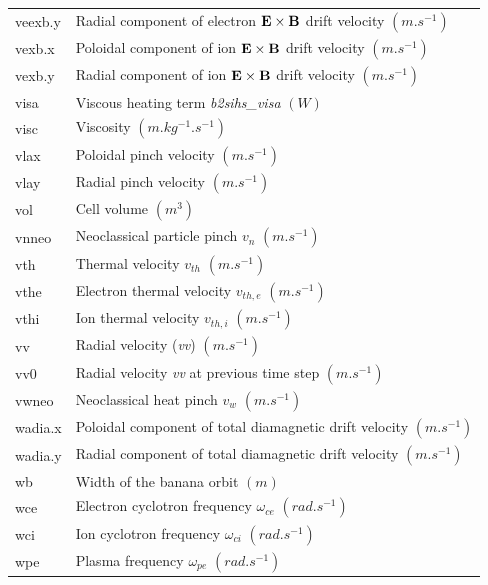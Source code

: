 \documentclass[a4paper,10pt]{report}
\begin{document}
\begin{center}
\begin{longtable}{|l|l|}
    veexb.y  & \index{b2plot, veexb.y} Radial component of electron ${\bf E} \times {\bf B}$ drift velocity $(m.s^{-1})$ \\
    vexb.x   & \index{b2plot, vexb.x} Poloidal component of ion ${\bf E} \times {\bf B}$ drift velocity $(m.s^{-1})$ \\
    vexb.y   & \index{b2plot, vexb.y} Radial component of ion ${\bf E} \times {\bf B}$ drift velocity $(m.s^{-1})$ \\
    visa     & \index{b2plot, visa} Viscous heating term {\em b2sihs\_visa} $(W)$ \\
    visc     & \index{b2plot, visc} Viscosity $(m.kg^{-1}.s^{-1})$ \\
    vlax     & \index{b2plot, vlax} Poloidal pinch velocity $(m.s^{-1})$ \\
    vlay     & \index{b2plot, vlay} Radial pinch velocity $(m.s^{-1})$ \\
    vol      & \index{b2plot, vol} Cell volume $(m^3)$ \\
    vnneo    & \index{b2plot, vnneo} Neoclassical particle pinch $v_n$ $(m.s^{-1})$ \\
    vth      & \index{b2plot, vth} Thermal velocity $v_{th}$ $(m.s^{-1})$ \\
    vthe     & \index{b2plot, vthe} Electron thermal velocity $v_{th,e}$ $(m.s^{-1})$ \\
    vthi     & \index{b2plot, vthi} Ion thermal velocity $v_{th,i}$ $(m.s^{-1})$ \\
    vv       & \index{b2plot, vv} Radial velocity ({\em vv}) $(m.s^{-1})$ \\
    vv0      & \index{b2plot, vv0} Radial velocity {\em vv} at previous time step $(m.s^{-1})$ \\
    vwneo    & \index{b2plot, vnneo} Neoclassical heat pinch $v_w$ $(m.s^{-1})$ \\
    wadia.x  & \index{b2plot, wadia.x} Poloidal component of total diamagnetic drift velocity $(m.s^{-1})$ \\
    wadia.y  & \index{b2plot, wadia.y} Radial component of total diamagnetic drift velocity $(m.s^{-1})$ \\
    wb       & \index{b2plot, wb} Width of the banana orbit $(m)$ \\
    wce      & \index{b2plot, wce} Electron cyclotron frequency $\omega_{ce}$ $(rad.s^{-1})$ \\
    wci      & \index{b2plot, wci} Ion cyclotron frequency $\omega_{ci}$ $(rad.s^{-1})$ \\
    wpe      & \index{b2plot, wpe} Plasma frequency $\omega_{pe}$ $(rad.s^{-1})$ \\

\end{longtable}
\end{center}
\end{document}
